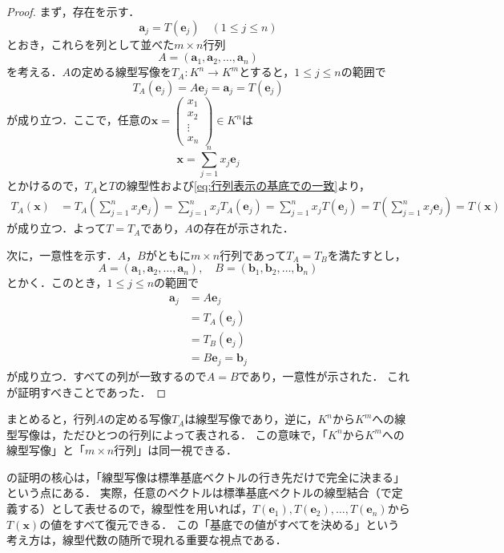 \begin{tleftbar}
\begin{proof}
  まず，存在を示す．
  \[
    \bm{a}_j = T(\bm{e}_j) \quad (1 \le j \le n)
  \]
  とおき，これらを列として並べた$m \times n$行列
  \[
    A = (\bm{a}_1, \bm{a}_2, \dots, \bm{a}_n)
  \]
  を考える．$A$の定める線型写像を$T_A \colon K^n \to K^m$とすると，$1 \le j \le n$の範囲で
  \begin{equation}
    T_A(\bm{e}_j) = A\bm{e}_j = \bm{a}_j = T(\bm{e}_j) \label{eq:行列表示の基底での一致}
  \end{equation}
  が成り立つ．ここで，任意の$\bm{x} = \begin{pmatrix} x_1 \\ x_2 \\ \vdots \\ x_n \end{pmatrix} \in K^n$は
  \[
    \bm{x} = \sum_{j=1}^{n} x_j \bm{e}_j
  \]
  とかけるので，$T_A$と$T$の線型性および\eqref{eq:行列表示の基底での一致}より，
  \begin{align*}
    T_A(\bm{x}) &= T_A\left(\sum_{j=1}^{n} x_j \bm{e}_j\right)
    = \sum_{j=1}^{n} x_j T_A(\bm{e}_j)
    = \sum_{j=1}^{n} x_j T(\bm{e}_j)
    = T\left(\sum_{j=1}^{n} x_j \bm{e}_j\right)
    = T(\bm{x})
  \end{align*}
  が成り立つ．よって$T = T_A$であり，$A$の存在が示された．

  次に，一意性を示す．$A$，$B$がともに$m \times n$行列であって$T_A = T_B$を満たすとし，
  \[
    A = (\bm{a}_1, \bm{a}_2, \dots, \bm{a}_n), \quad
    B = (\bm{b}_1, \bm{b}_2, \dots, \bm{b}_n)
  \]
  とかく．このとき，$1 \le j \le n$の範囲で
  \begin{align}
    \bm{a}_j &= A\bm{e}_j \nonumber \\
    &= T_A(\bm{e}_j) \tag{$T_A$の定義} \\
    &= T_B(\bm{e}_j) \tag{$T_A = T_B$} \\
    &= B\bm{e}_j = \bm{b}_j \nonumber
  \end{align}
  が成り立つ．すべての列が一致するので$A = B$であり，一意性が示された．
  これが証明すべきことであった．
\end{proof}
\end{tleftbar}

まとめると，行列$A$の定める写像$T_A$は線型写像であり，逆に，$K^n$から$K^m$への線型写像は，ただひとつの行列によって表される．
この意味で，「$K^n$から$K^m$への線型写像」と「$m \times n$行列」は同一視できる．

\begin{remark}[線型写像は基底ベクトルの行き先で決まる]
  の証明の核心は，「線型写像は標準基底ベクトルの行き先だけで完全に決まる」という点にある．
  実際，任意のベクトルは標準基底ベクトルの線型結合（で定義する）として表せるので，線型性を用いれば，$T(\bm{e}_1), T(\bm{e}_2), \dots, T(\bm{e}_n)$から$T(\bm{x})$の値をすべて復元できる．
  この「基底での値がすべてを決める」という考え方は，線型代数の随所で現れる重要な視点である．
\end{remark}

